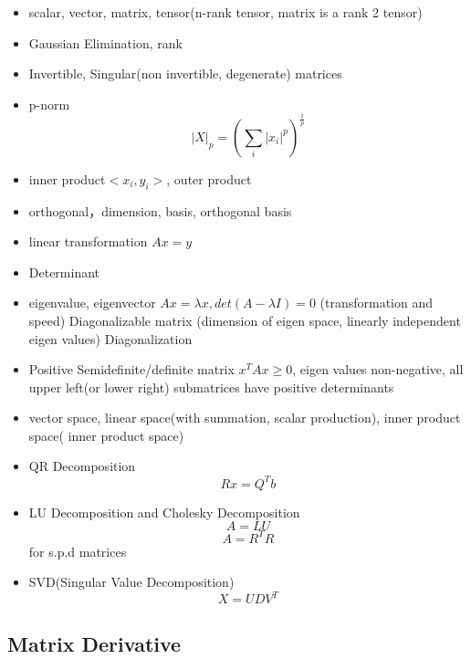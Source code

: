 \documentclass[11pt, openany]{book}              %
\begin{document}
\begin{itemize}
    \item scalar, vector, matrix, tensor(n-rank tensor, matrix is a rank 2 tensor) 
    \item Gaussian Elimination, rank
    \item Invertible, Singular(non invertible, degenerate) matrices
    \item p-norm $$|X|_p = (\sum_i |x_i|^p)^{\frac{1}{p}}$$
    \item inner product$<x_i,y_i>$, outer product
    \item orthogonal，dimension, basis, orthogonal basis
    \item linear transformation $Ax = y$
    \item Determinant
    \item eigenvalue, eigenvector $Ax =\lambda x, det(A - \lambda I) = 0$ (transformation and speed)
    	\subitem Diagonalizable matrix (dimension of eigen space, linearly independent eigen values)
    	\subitem Diagonalization
    \item Positive Semidefinite/definite matrix
    	\subitem $x^TAx \geq 0$, eigen values non-negative, all upper left(or lower right) submatrices have positive determinants
    \item vector space, linear space(with summation, scalar production), inner product space( inner product space) 
    \item QR Decomposition $$ Rx = Q^Tb$$
    \item LU Decomposition and Cholesky Decomposition
    	\subitem $$A = LU$$
    	\subitem $$A = R^TR$$ for s.p.d matrices
     \item SVD(Singular Value Decomposition) 
     $$ X= UDV^T$$
\end{itemize}

\subsection{Matrix Derivative}
\end{document}
